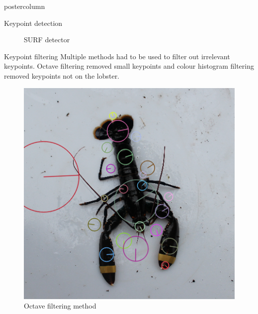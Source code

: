 \documentclass{beamer}
\begin{document}
\begin{frame}
\begin{columns}
\begin{column}{.4\textwidth}
\begin{beamercolorbox}[center]{postercolumn}
\begin{minipage}{.98\textwidth}
{\begin{myblock}{Keypoint detection}
\begin{center}
\begin{minipage}{0.42\textwidth}
\begin{figure}
\caption{SURF detector}
\end{figure}
\end{minipage}
\end{center}
\vspace*{-0.5cm}
\end{myblock}

\begin{myblock}{Keypoint filtering}
Multiple methods had to be used to filter out irrelevant keypoints. Octave filtering removed small keypoints and colour histogram filtering removed keypoints not on the lobster.
\begin{center}
\begin{minipage}{0.42\textwidth}
\begin{figure}
\includegraphics[width=1\textwidth, keepaspectratio]{imgs/octave.png}
\caption{Octave filtering method}
\end{figure}
\end{minipage}
\hspace{0.7cm}
\begin{minipage}{0.42\textwidth}
\begin{figure}

\end{figure}
\end{minipage}
\end{center}
\end{myblock}}
\end{minipage}
\end{beamercolorbox}
\end{column}
\end{columns}
\end{frame}
\end{document}

